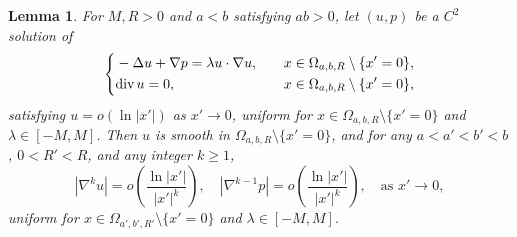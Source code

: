 \documentclass[12pt]{article}
\newtheorem{lem}{Lemma}[section]
\newcommand{\dive}{{\rm div \hspace{0.05cm} }}
\begin{document}
\begin{lem}\label{lem:2_1}
	For $M, R>0$ and $a<b$ satisfying $ab>0$, let $(u,p)$ be a $C^{2}$ solution of 
	\begin{equation}
	\left\{ 
	\begin{aligned}
		& - \Delta u + \nabla p = \lambda u \cdot \nabla u, \quad && x\in\Omega_{a, b, R}\setminus\{x'=0\},\\
		& \dive u=0, \quad && x\in \Omega_{a, b, R}\setminus\{x'=0\},
	\end{aligned}
	\right.
	\end{equation}
	satisfying $u=o(\ln |x'|)$ as $x'\to 0$, uniform for $x\in \Omega_{a, b, R}\setminus\{x'=0\}$ and $\lambda\in [-M, M]$. Then $u$ is smooth in $\Omega_{a, b, R}\setminus \{x'=0\}$, and for any $a<a'<b'<b$, $0<R'<R$, and any integer $k\ge 1$, 
	\begin{equation}\label{eq:lem:2_1}
		| \nabla^k u | = o \left(\frac{\ln |x'|}{|x'|^k}\right), 
		\quad |\nabla^{k-1} p|=o\left(\frac{\ln |x'|}{|x'|^{k}}\right), \quad \textrm{as } x'\to 0, 
	\end{equation}
	uniform for $x\in \Omega_{a', b', R'}\setminus\{x'=0\}$ and $\lambda\in [-M, M]$. 
\end{lem}
\end{document}
